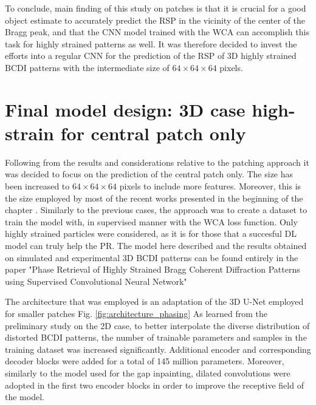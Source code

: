 To conclude, main finding of this study on patches is that it is crucial for a good object estimate to accurately predict 
the RSP in the vicinity of the center of the Bragg peak, and that the CNN model trained with the WCA can accomplish this task 
for highly strained patterns as well. It was therefore decided to invest the efforts into a regular CNN for the prediction 
of the RSP of 3D highly strained BCDI patterns with the intermediate size of $64\times64\times64$ pixels. 

\section{Final model design: 3D case high-strain for central patch only }\label{chp:3d_final_strain}

Following from the results and considerations relative to the patching approach it was decided to focus on the prediction 
of the central patch only. The size has been increased to $64\times64\times64$ pixels to include more features. Moreover, this 
is the size employed by most of the recent works presented in the beginning of the chapter \cite{yao_autophasenn_2022, wu_three-dimensional_2021, lim_convolutional_2021}. 
Similarly to the previous cases, the approach was to create a dataset to train the model with, in supervised manner with 
the WCA loss function. Only highly strained particles were considered, as it is for those that a succesful DL model can 
truly help the PR. 
The model here described and the results obtained on simulated and experimental 3D BCDI patterns can be found entirely 
in the paper "Phase Retrieval of Highly Strained Bragg Coherent Diffraction Patterns using Supervised Convolutional Neural Network" 
\cite{Masto2025} 


The architecture that was employed is an adaptation of the 3D U-Net employed for smaller patches Fig. \ref{fig:architecture_phasing}
As learned from the preliminary study on the 2D case, to better interpolate the diverse distribution of distorted BCDI patterns, 
the number of trainable parameters and samples in the training dataset was increased significantly. Additional encoder 
and corresponding decoder blocks were added for a total of 145 million parameters. Moreover, similarly to the model 
used for the gap inpainting, dilated convolutions were adopted in the first two encoder blocks in order to improve 
the receptive field of the model. 

